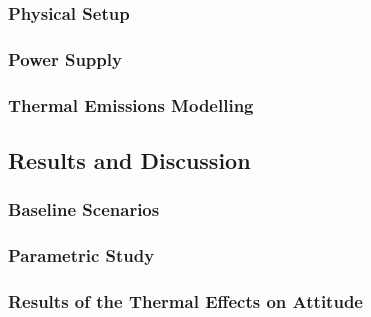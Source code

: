 \lipsum

\subsubsection{Physical Setup}

\lipsum

\subsubsection{Power Supply}
\label{subsec:Power_Supply}

\lipsum

\subsubsection{Thermal Emissions Modelling}
\label{sec:Initial_Study}

\lipsum

\subsection{Results and Discussion}
\label{sec:Results_Discussion}

\lipsum

\subsubsection{Baseline Scenarios}
\label{subsec:Scenarios}

\lipsum

\subsubsection{Parametric Study}
\label{subsec:parametric_study}

\lipsum

\subsubsection{Results of the Thermal Effects on Attitude}
\label{sec:attitude_results}

\lipsum



